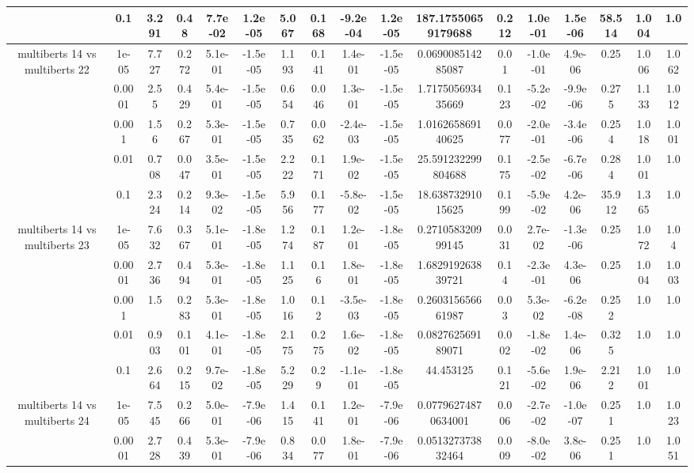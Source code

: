 \begin{tabular}{|c|c|c|c|c|c|c|c|c|c|c|c|c|c|c|c|c|}
 & 0.1 & 3.291 & 0.48 & 7.7e-02 & 1.2e-05 & 5.067 & 0.168 & -9.2e-04 & 1.2e-05 & 187.17550659179688 & 0.212 & 1.0e-01 & 1.5e-06 & 58.514 & 1.004 & 1.0 \\
\hline
\multirow{5}{*}{multiberts 14 vs multiberts 22} & 1e-05 & 7.727 & 0.272 & 5.1e-01 & -1.5e-05 & 1.193 & 0.141 & 1.4e-01 & -1.5e-05 & 0.069008514285087 & 0.01 & -1.0e-01 & 4.9e-06 & 0.25 & 1.006 & 1.062 \\
 & 0.0001 & 2.55 & 0.429 & 5.4e-01 & -1.5e-05 & 0.654 & 0.046 & 1.3e-01 & -1.5e-05 & 1.717505693435669 & 0.123 & -5.2e-02 & -9.9e-06 & 0.275 & 1.133 & 1.012 \\
 & 0.001 & 1.56 & 0.267 & 5.3e-01 & -1.5e-05 & 0.735 & 0.062 & -2.4e-03 & -1.5e-05 & 1.016265869140625 & 0.077 & -2.0e-01 & -3.4e-06 & 0.254 & 1.018 & 1.001 \\
 & 0.01 & 0.708 & 0.047 & 3.5e-01 & -1.5e-05 & 2.222 & 0.171 & 1.9e-02 & -1.5e-05 & 25.591232299804688 & 0.175 & -2.5e-02 & -6.7e-06 & 0.284 & 1.001 & 1.0 \\
 & 0.1 & 2.324 & 0.214 & 9.3e-02 & -1.5e-05 & 5.956 & 0.177 & -5.8e-02 & -1.5e-05 & 18.63873291015625 & 0.199 & -5.9e-02 & 4.2e-06 & 35.912 & 1.365 & 1.0 \\
\hline
\multirow{5}{*}{multiberts 14 vs multiberts 23} & 1e-05 & 7.632 & 0.367 & 5.1e-01 & -1.8e-05 & 1.274 & 0.187 & 1.2e-01 & -1.8e-05 & 0.271058320999145 & 0.031 & 2.7e-02 & -1.3e-06 & 0.25 & 1.072 & 1.04 \\
 & 0.0001 & 2.736 & 0.494 & 5.3e-01 & -1.8e-05 & 1.125 & 0.16 & 1.8e-01 & -1.8e-05 & 1.682919263839721 & 0.14 & -2.3e-01 & 4.3e-06 & 0.25 & 1.004 & 1.003 \\
 & 0.001 & 1.5 & 0.283 & 5.3e-01 & -1.8e-05 & 1.016 & 0.12 & -3.5e-03 & -1.8e-05 & 0.260315656661987 & 0.03 & 5.3e-02 & -6.2e-08 & 0.252 & 1.0 & 1.0 \\
 & 0.01 & 0.903 & 0.101 & 4.1e-01 & -1.8e-05 & 2.175 & 0.275 & 1.6e-02 & -1.8e-05 & 0.082762569189071 & 0.002 & -1.8e-02 & 1.4e-06 & 0.325 & 1.0 & 1.0 \\
 & 0.1 & 2.664 & 0.215 & 9.7e-02 & -1.8e-05 & 5.229 & 0.29 & -1.1e-01 & -1.8e-05 & 44.453125 & 0.121 & -5.6e-02 & 1.9e-06 & 2.212 & 1.001 & 1.0 \\
\hline
\multirow{5}{*}{multiberts 14 vs multiberts 24} & 1e-05 & 7.545 & 0.266 & 5.0e-01 & -7.9e-06 & 1.415 & 0.141 & 1.2e-01 & -7.9e-06 & 0.07796274870634001 & 0.006 & -2.7e-02 & -1.0e-07 & 0.251 & 1.0 & 1.023 \\
 & 0.0001 & 2.728 & 0.439 & 5.3e-01 & -7.9e-06 & 0.834 & 0.077 & 1.8e-01 & -7.9e-06 & 0.051327373832464 & 0.009 & -8.0e-02 & 3.8e-06 & 0.251 & 1.0 & 1.051 \\

\end{tabular}
